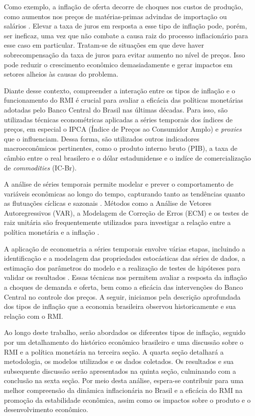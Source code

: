 \documentclass[12pt,oneside,a4paper,chapter=TITLE,english,brazil,sumario=abnt-6027-2012]{abntex2}
\begin{document}
Como exemplo, a inflação de oferta decorre de choques nos custos de produção, como aumentos nos preços de matérias-primas advindas de importação ou salários \cite{blinder_2008_the}. Elevar a taxa de juros em resposta a esse tipo de inflação pode, porém, ser ineficaz, uma vez que não combate a causa raiz do processo inflacionário para esse caso em particular. Tratam-se de situações em que deve haver sobrecompensação da taxa de juros para evitar aumento no nível de preços. Isso pode reduzir o crescimento econômico demasiadamente e gerar impactos em setores alheios às causas do problema.

 Diante desse contexto, compreender a interação entre os tipos de inflação e o funcionamento do RMI é crucial para avaliar a eficácia das políticas monetárias adotadas pelo Banco Central do Brasil nas últimas décadas. Para isso, são utilizadas técnicas econométricas aplicadas a séries temporais dos índices de preços, em especial o IPCA (Índice de Preços ao Consumidor Amplo) e \textit{proxies} que o influenciam. Dessa forma, são utilizados outros indicadores macroeconômicos pertinentes, como o produto interno bruto (PIB), a taxa de câmbio entre o real brasilero e o dólar estadunidense e o indíce de comercialização de \textit{commodities} (IC-Br).

A análise de séries temporais permite modelar e prever o comportamento de variáveis econômicas ao longo do tempo, capturando tanto as tendências quanto as flutuações cíclicas e sazonais \cite{enders_2015_applied}. Métodos como a Análise de Vetores Autoregressivos (VAR), a Modelagem de Correção de Erros (ECM) e os testes de raiz unitária são frequentemente utilizados para investigar a relação entre a política monetária e a inflação \cite{hamilton_2020_time}.

A aplicação de econometria a séries temporais envolve várias etapas, incluindo a identificação e a modelagem das propriedades estocásticas das séries de dados, a estimação dos parâmetros do modelo e a realização de testes de hipóteses para validar os resultados \cite{stock_2020_introduction}. Essas técnicas nos permitem avaliar a resposta da inflação a choques de demanda e oferta, bem como a eficácia das intervenções do Banco Central no controle dos preços. A seguir, iniciamos pela descrição aprofundada dos tipos de inflação que a economia brasileira observou historicamente e sua relação com o RMI.

Ao longo deste trabalho, serão abordados os diferentes tipos de inflação, seguido por um detalhamento do histórico econômico brasileiro e uma discussão sobre o RMI e a política monetária na terceira seção. A quarta seção detalhará a metodologia, os modelos utilizados e os dados coletados. Os resultados e sua subsequente discussão serão apresentados na quinta seção, culminando com a conclusão na sexta seção. Por meio desta análise, espera-se contribuir para uma melhor compreensão da dinâmica inflacionária no Brasil e a eficácia do RMI na promoção da estabilidade econômica, assim como os impactos sobre o produto e o desenvolvimento econômico.
\end{document}
